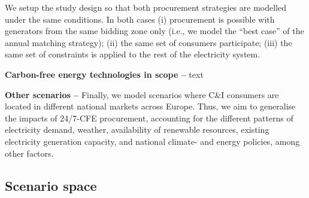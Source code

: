 We setup the study design so that both procurement strategies are modelled under the same conditions.
In both cases (i) procurement is possible with generators from the same bidding zone only (i.e., we model the \enquote{best case} of the annual matching strategy); (ii) the same set of consumers participate; (iii) the same set of constraints is applied to the rest of the electricity system.

\textbf{Carbon-free energy technologies in scope --} text


\textbf{Other scenarios --}
Finally, we model scenarios where C\&I consumers are located in different national markets across Europe. 
Thus, we aim to generalise the impacts of 24/7-CFE procurement, accounting for the different patterns of electricity demand, weather, availability of renewable resources, existing electricity generation capacity, and national climate- and energy policies, among other factors.


\subsection{Scenario space}
\label{subsec:scenarios}
